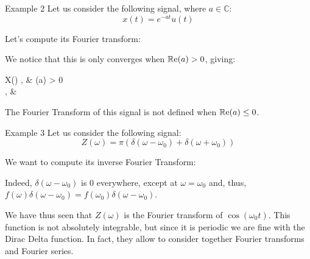 \documentclass[a4paper]{article}
\begin{document}
\begin{parag}{Example 2}
    Let us consider the following signal, where $a \in \mathbb{C}$: 
    \[x\left(t\right) = e^{-at} u\left(t\right)\]
    
    Let's compute its Fourier transform: 
    
    We notice that this is only converges when $\cre\left(a\right) > 0$, giving: 
    \begin{functionbypart}{X\left(\omega\right)}
        , & \cre\left(a\right) > 0 \\
        \infty, & 
    \end{functionbypart}
    
    The Fourier Transform of this signal is not defined when $\cre\left(a\right) \leq 0$.
\end{parag}

\begin{parag}{Example 3}
    Let us consider the following signal: 
    \[Z\left(\omega\right) = \pi\left(\delta\left(\omega - \omega_0\right) + \delta\left(\omega + \omega_0\right)\right)\]
    
    We want to compute its inverse Fourier Transform: 
    
    Indeed, $\delta\left(\omega - \omega_0\right)$ is $0$ everywhere, except at $\omega = \omega_0$ and, thus, $f\left(\omega\right)\delta\left(\omega - \omega_0\right) = f\left(\omega_0\right)\delta\left(\omega - \omega_0\right)$.
    
    We have thus seen that $Z\left(\omega\right)$ is the Fourier transform of $\cos\left(\omega_0 t\right)$. This function is not absolutely integrable, but since it is periodic we are fine with the Dirac Delta function. In fact, they allow to consider together Fourier transforms and Fourier series.
\end{parag}
\end{document}
